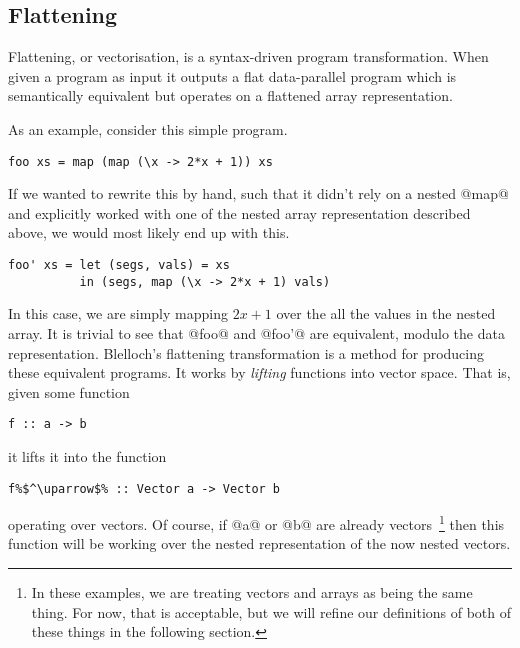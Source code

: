 \subsection{Flattening}

Flattening, or vectorisation, is a syntax-driven program transformation. When given a program as input it outputs a flat data-parallel program which is semantically equivalent but operates on a flattened array representation.

As an example, consider this simple program.
%
\begin{lstlisting}
foo xs = map (map (\x -> 2*x + 1)) xs
\end{lstlisting}
%
If we wanted to rewrite this by hand, such that it didn't rely on a nested @map@ and explicitly worked with one of the nested array representation described above, we would most likely end up with this.
%
\begin{lstlisting}
foo' xs = let (segs, vals) = xs
          in (segs, map (\x -> 2*x + 1) vals)
\end{lstlisting}
%
In this case, we are simply mapping $2x+1$ over the all the values in the nested array. It is trivial to see that @foo@ and @foo'@ are equivalent, modulo the data representation. Blelloch's flattening transformation is a method for producing these equivalent programs. It works by \emph{lifting} functions into vector space. That is, given some function
%
\begin{lstlisting}
f :: a -> b
\end{lstlisting}
%
it lifts it into the function
%
\begin{lstlisting}
f%$^\uparrow$% :: Vector a -> Vector b
\end{lstlisting}
%
operating over vectors. Of course, if @a@ or @b@ are already vectors~\footnote{In these examples, we are treating vectors and arrays as being the same thing. For now, that is acceptable, but we will refine our definitions of both of these things in the following section.} then this function will be working over the nested representation of the now nested vectors.

